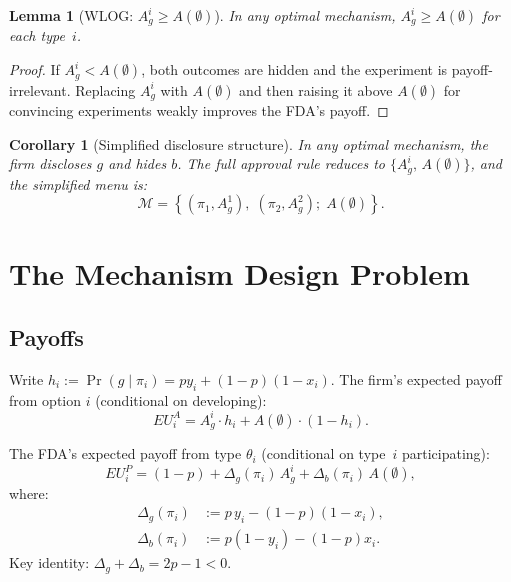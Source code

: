 \documentclass[12pt,a4paper]{article}
\newtheorem{lemma}{Lemma}
\newtheorem{corollary}{Corollary}
\begin{document}
\begin{lemma}[WLOG: $A_g^i \geq A(\emptyset)$]
\label{lem:wlog_Ag}
In any optimal mechanism, $A_g^i \geq A(\emptyset)$ for each
type~$i$.
\end{lemma}

\begin{proof}
If $A_g^i < A(\emptyset)$, both outcomes are hidden and the
experiment is payoff-irrelevant. Replacing $A_g^i$ with
$A(\emptyset)$ and then raising it above $A(\emptyset)$ for
convincing experiments weakly improves the FDA's payoff.
\end{proof}

\begin{corollary}[Simplified disclosure structure]
\label{cor:disclosure}
In any optimal mechanism, the firm discloses $g$ and hides
$b$. The full approval rule reduces to
$\{A_g^i,\,A(\emptyset)\}$, and the simplified menu is:
\begin{equation}\label{eq:menu}
  \mathcal{M} = \left\{
    \left(\pi_1, A_g^1\right),\;
    \left(\pi_2, A_g^2\right);\;
    A(\emptyset)
  \right\}.
\end{equation}
\end{corollary}


\section{The Mechanism Design Problem}
\label{sec:mechanism}

\subsection{Payoffs}

Write $h_i := \Pr(g \mid \pi_i) = p y_i + (1-p)(1-x_i)$.
The firm's expected payoff from option $i$ (conditional on
developing):
\begin{equation}\label{eq:EU_A}
  EU^A_i = A_g^i \cdot h_i
    + A(\emptyset) \cdot (1 - h_i).
\end{equation}

The FDA's expected payoff from type $\theta_i$
(conditional on type~$i$ participating):
\begin{equation}\label{eq:EU_P_compact}
  EU^P_i = (1-p) + \Delta_g(\pi_i) \, A_g^i
           + \Delta_b(\pi_i) \, A(\emptyset),
\end{equation}
where:
\begin{align}
  \Delta_g(\pi_i)
    &:= p \, y_i - (1-p)(1-x_i),
    \label{eq:delta_g_def} \\
  \Delta_b(\pi_i)
    &:= p(1-y_i) - (1-p) x_i.
    \label{eq:delta_b_def}
\end{align}
Key identity: $\Delta_g + \Delta_b = 2p - 1 < 0$.
\end{document}
